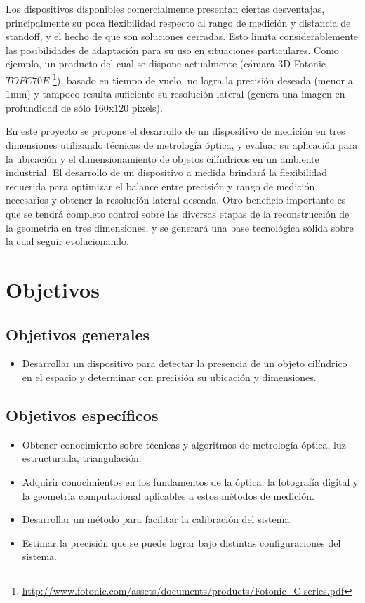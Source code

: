 Los dispositivos disponibles comercialmente presentan ciertas desventajas, principalmente su poca flexibilidad respecto al rango de medición y distancia de standoff, y el hecho de que son soluciones cerradas. Esto limita considerablemente las posibilidades de adaptación para su uso en situaciones particulares. Como ejemplo, un producto del cual se dispone actualmente (cámara 3D Fotonic $TOFC70E$ \footnote{\url{http://www.fotonic.com/assets/documents/products/Fotonic_C-series.pdf}}), basado en tiempo de vuelo, no logra la precisión deseada (menor a $1$mm) y tampoco resulta suficiente su resolución lateral (genera una imagen en profundidad de sólo $160$x$120$ pixels).

En este proyecto se propone el desarrollo de un dispositivo de medición en tres dimensiones utilizando técnicas de metrología óptica, y evaluar su aplicación para la ubicación y el dimensionamiento de objetos cilíndricos en un ambiente industrial. El desarrollo de un dispositivo a medida brindará la flexibilidad requerida para optimizar el balance entre precisión y rango de medición necesarios y obtener la resolución lateral deseada. Otro beneficio importante es que se tendrá completo control sobre las diversas etapas de la reconstrucción de la geometría en tres dimensiones, y se generará una base tecnológica sólida sobre la cual seguir evolucionando.

\section{Objetivos}
\subsection{Objetivos generales}
\begin{itemize}
\item Desarrollar un dispositivo para detectar la presencia de un objeto cilíndrico en el espacio y determinar con precisión su ubicación y dimensiones.
\end{itemize}

\subsection{Objetivos específicos}
\begin{itemize}
\item Obtener conocimiento sobre técnicas y algoritmos de metrología óptica, luz estructurada, triangulación.
\item Adquirir conocimientos en los fundamentos de la óptica, la fotografía digital y la geometría computacional aplicables a estos métodos de medición.
\item Desarrollar un método para facilitar la calibración del sistema.
\item Estimar la precisión que se puede lograr bajo distintas configuraciones del sistema.
\end{itemize}

